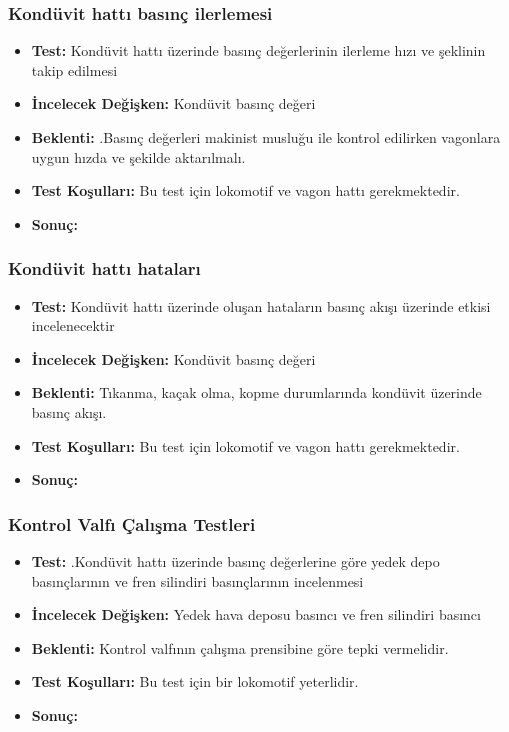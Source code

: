 \documentclass[10pt,a4paper]{article}
\begin{document}
\subsubsection{Kondüvit hattı basınç ilerlemesi}
\begin{itemize}
\item \textbf{Test:} Kondüvit hattı üzerinde basınç değerlerinin ilerleme hızı ve şeklinin takip edilmesi\\
\item \textbf{İncelecek Değişken:} Kondüvit basınç değeri\\
\item \textbf{Beklenti:} .Basınç değerleri makinist musluğu ile kontrol edilirken vagonlara uygun hızda ve şekilde aktarılmalı.\\
\item \textbf{Test Koşulları:} Bu test için lokomotif ve vagon hattı gerekmektedir. \\
\item \textbf{Sonuç:}
\end{itemize}

\subsubsection{Kondüvit hattı hataları}
\begin{itemize}
\item \textbf{Test:} Kondüvit hattı üzerinde oluşan hataların basınç akışı üzerinde etkisi incelenecektir\\
\item \textbf{İncelecek Değişken:} Kondüvit basınç değeri\\
\item \textbf{Beklenti:} Tıkanma, kaçak olma, kopme durumlarında kondüvit üzerinde basınç akışı.\\
\item \textbf{Test Koşulları:} Bu test için lokomotif ve vagon hattı gerekmektedir. \\
\item \textbf{Sonuç:}
\end{itemize}


\subsubsection{Kontrol Valfı Çalışma Testleri}
\begin{itemize}
\item \textbf{Test:} .Kondüvit hattı üzerinde basınç değerlerine göre yedek depo basınçlarının ve fren silindiri basınçlarının incelenmesi\\
\item \textbf{İncelecek Değişken:} Yedek hava deposu basıncı ve fren silindiri basıncı\\
\item \textbf{Beklenti:} Kontrol valfının çalışma prensibine göre tepki vermelidir.\\
\item \textbf{Test Koşulları:} Bu test için bir lokomotif yeterlidir.\\
\item \textbf{Sonuç:}
\end{itemize}
\end{document}
